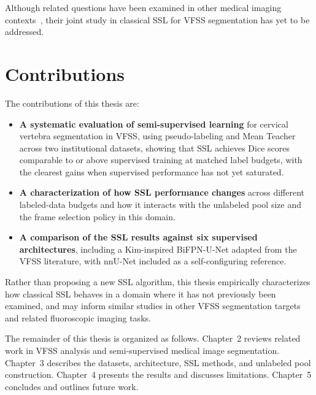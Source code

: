 \documentclass[
  msc,
  american
]{ThesisPUC_v2}
\begin{document}
Although related questions have been examined in other medical imaging contexts~\citep{ref_fu2019}, their joint study in classical SSL for VFSS segmentation has yet to be addressed.


\section{Contributions}
\label{sec:intro-contribs}

The contributions of this thesis are:

\begin{itemize}
\renewcommand{\labelitemi}{--}
\item \textbf{A systematic evaluation of semi-supervised learning} for cervical vertebra segmentation in VFSS, using pseudo-labeling and Mean Teacher across two institutional datasets, showing that SSL achieves Dice scores comparable to or above supervised training at matched label budgets, with the clearest gains when supervised performance has not yet saturated.

\item \textbf{A characterization of how SSL performance changes} across different labeled-data budgets and how it interacts with the unlabeled pool size and the frame selection policy in this domain.

\item \textbf{A comparison of the SSL results against six supervised architectures}, including a Kim-inspired BiFPN-U-Net adapted from the VFSS literature, with nnU-Net included as a self-configuring reference.
\end{itemize}

Rather than proposing a new SSL algorithm, this thesis empirically characterizes how classical SSL behaves in a domain where it has not previously been examined, and may inform similar studies in other VFSS segmentation targets and related fluoroscopic imaging tasks.

The remainder of this thesis is organized as follows. Chapter~2 reviews related work in VFSS analysis and semi-supervised medical image segmentation. Chapter~3 describes the datasets, architecture, SSL methods, and unlabeled pool construction. Chapter~4 presents the results and discusses limitations. Chapter~5 concludes and outlines future work.


\end{document}
